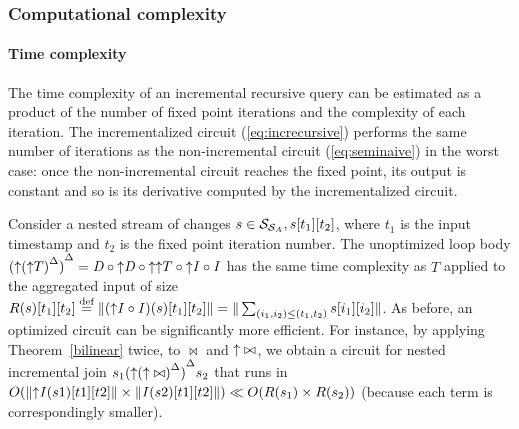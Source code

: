 
\subsubsection{Computational complexity}

\paragraph{Time complexity}

The time complexity of an incremental recursive query can be estimated as a product of
the number of fixed point iterations and the complexity of each iteration. The
incrementalized circuit (\ref{eq:increcursive}) performs the same number of
iterations as the non-incremental circuit (\ref{eq:seminaive}) in the worst case:
once the non-incremental circuit reaches the fixed point, its output is constant
and so is its derivative computed by the incrementalized circuit.

Consider a nested stream of changes $s \in \mathcal{S}_{\mathcal{S}_{A}}, s[t_1][t_2]$,
where $t_1$ is the input timestamp and $t_2$ is the fixed point iteration number.
The unoptimized loop body ${({\uparrow}{({\uparrow}T)}^{\Delta})}^{\Delta} = 
\mathit{D} \circ {\uparrow}\mathit{D} \circ {\uparrow}{\uparrow}T
\circ {\uparrow}\mathit{I} \circ \mathit{I}$ has the same time complexity as $T$ applied to the
aggregated input of size $R(s)[t_1][t_2] \stackrel{\textrm{\scriptsize def}}{=} \| ({\uparrow}\mathit{I} \circ
\mathit{I})(s)[t_1][t_2] \| = \| \sum_{(i_1,i_2) \leq (t_1, t_2)} s[i_1][i_2] \|$.  As
before, an optimized circuit can be significantly more efficient.  For instance,
by applying Theorem~\ref{bilinear} twice, to $\bowtie$ and ${\uparrow}\bowtie$, we
obtain a circuit for nested incremental join $s_1
{({\uparrow}{({\uparrow}\bowtie)}^{\Delta})}^{\Delta} s_2$ that runs in
$O(\| {\uparrow}\mathit{I}(s1)[t1][t2] \| \times \| \mathit{I}(s2)[t1][t2] \|) \ll 
O(R(s_1) \times R(s_2))$ (because each term is correspondingly smaller).

